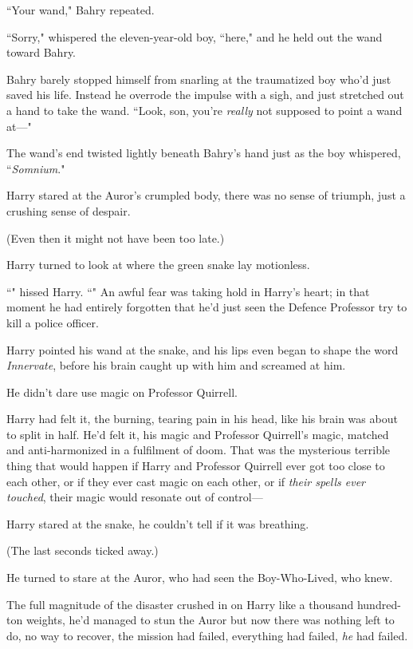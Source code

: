 ``Your wand," Bahry repeated.

``Sorry," whispered the eleven-year-old boy, ``here," and he held out the wand toward Bahry.

Bahry barely stopped himself from snarling at the traumatized boy who'd just saved his life. Instead he overrode the impulse with a sigh, and just stretched out a hand to take the wand. ``Look, son, you're \emph{really} not supposed to point a wand at—"

The wand's end twisted lightly beneath Bahry's hand just as the boy whispered, ``\emph{Somnium}."

\later

Harry stared at the Auror's crumpled body, there was no sense of triumph, just a crushing sense of despair.

(Even then it might not have been too late.)

Harry turned to look at where the green snake lay motionless.

``" hissed Harry. ``" An awful fear was taking hold in Harry's heart; in that moment he had entirely forgotten that he'd just seen the Defence Professor try to kill a police officer.

Harry pointed his wand at the snake, and his lips even began to shape the word \emph{Innervate}, before his brain caught up with him and screamed at him.

He didn't dare use magic on Professor Quirrell.

Harry had felt it, the burning, tearing pain in his head, like his brain was about to split in half. He'd felt it, his magic and Professor Quirrell's magic, matched and anti-harmonized in a fulfilment of doom. That was the mysterious terrible thing that would happen if Harry and Professor Quirrell ever got too close to each other, or if they ever cast magic on each other, or if \emph{their spells ever touched}, their magic would resonate out of control—

Harry stared at the snake, he couldn't tell if it was breathing.

(The last seconds ticked away.)

He turned to stare at the Auror, who had seen the Boy-Who-Lived, who knew.

The full magnitude of the disaster crushed in on Harry like a thousand hundred-ton weights, he'd managed to stun the Auror but now there was nothing left to do, no way to recover, the mission had failed, everything had failed, \emph{he} had failed.

